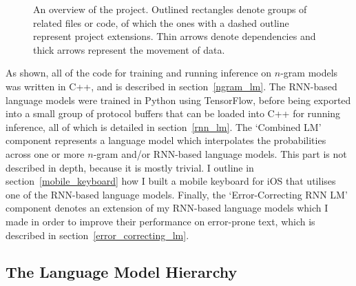 \documentclass[a4paper, 12pt]{report}
\begin{document}
\begin{figure}[h]
\begin{adjustbox}{center}
\end{adjustbox}
\caption{An overview of the project. Outlined rectangles denote groups of related files or code, of which the ones with a dashed outline represent project extensions. Thin arrows denote dependencies and thick arrows represent the movement of data.}
\label{fig:system_overview}
\end{figure}

As shown, all of the code for training and running inference on $n$-gram models was written in C++, and is described in section~\ref{ngram_lm}. The RNN-based language models were trained in Python using TensorFlow, before being exported into a small group of protocol buffers that can be loaded into C++ for running inference, all of which is detailed in section~\ref{rnn_lm}. The `Combined LM' component represents a language model which interpolates the probabilities across one or more $n$-gram and/or RNN-based language models. This part is not described in depth, because it is mostly trivial. I outline in section~\ref{mobile_keyboard} how I built a mobile keyboard for iOS that utilises one of the RNN-based language models. Finally, the `Error-Correcting RNN LM' component denotes an extension of my RNN-based language models which I made in order to improve their performance on error-prone text, which is described in section~\ref{error_correcting_lm}. \\

\subsection{The Language Model Hierarchy} \label{lm_interface}
\end{document}
